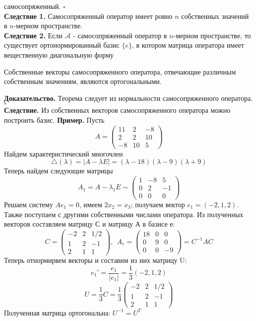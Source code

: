 самосопряженный. $\square$\\
\textbf{Следствие 1.} Самосопряженный оператор имеет ровно $n$ собственных 
значений в $n$-мерном пространстве.\\
\textbf{Следствие 2.} Если $\mathcal A$ - самосопряженный оператор в $n$-мерном
пространстве, то  существует ортонормированный базис $\{e\}$, в котором матрица
оператора имеет вещественную диагональную форму  
\begin{theor}
Собственные векторы самосопряженного оператора, отвечающие различным собственным
значениям, являются ортогональными.
\end{theor}
\textbf{Доказательство.} Теорема следует из нормальности самосопряженного 
оператора. $\square$\\
\textbf{Следствие.} Из собственных векторов самосопряженного оператора можно
построить базис. 
\textbf{Пример.} Пусть 
$$A=\begin{pmatrix}11&2&-8\\2&2&10\\-8&10&5\end{pmatrix}$$
Найдем характеристический многочлен
$$\triangle(\lambda)=|A-\lambda E|=(\lambda-18)(\lambda-9)(\lambda+9)$$
Теперь найдем следующие матрицы
$$A_1=A-\lambda_1E\sim\begin{pmatrix}1&-8&5\\0&2&-1\\0&0&0\end{pmatrix}$$
Решаем систему $Ae_1=0$, имеем $2x_2=x_3$; получаем вектор $e_1=(-2,1,2)$. 
Также поступаем с другими собственными числами оператора. Из полученных 
векторов составляем матрицу С и матрицу А в базисе е:
$$C=\begin{pmatrix}-2&2&1/2\\1&2&-1\\2&1&1\end{pmatrix},~~A_e=
\begin{pmatrix}18&0&0\\0&9&0\\0&0&-9\end{pmatrix}=C^{-1}AC$$
Теперь отнормирвем векторы и составим из них матрицу U:
$$e_1'=\frac{e_1}{|e_1|}=\frac13(-2,1,2)$$
$$U=\frac13C=\frac13\begin{pmatrix}-2&2&1/2\\1&2&-1\\2&1&1\end{pmatrix}$$
Полученная матрица ортогональна: $U^{-1}=U^T$






